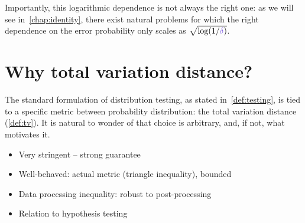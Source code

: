 Importantly, this logarithmic dependence is not always the right one: as we will see in~\cref{chap:identity}, there exist natural problems for which the right dependence on the error probability only scales as $\sqrt{\log(1/\errprob)}$.

\section{Why total variation distance?}

The standard formulation of distribution testing, as stated in~\cref{def:testing}, is tied to a specific metric between probability distribution: the total variation distance (\cref{def:tv}). It is natural to wonder of that choice is arbitrary, and, if not, what motivates it.

\tbc
\begin{itemize}
  \item Very stringent -- strong guarantee
  \item Well-behaved: actual metric (triangle inequality), bounded
  \item Data processing inequality: robust to post-processing
  \item Relation to hypothesis testing
\end{itemize}

